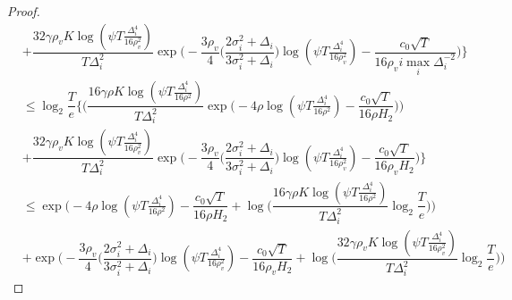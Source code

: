 \begin{proof}
\begin{align*}
& +  \dfrac{32\gamma\rho_v K\log (\psi T \frac{\Delta_{i}^{4}}{16\rho_{v}^{2}})}{T\Delta_{i}^{2}}\exp\bigg(- \dfrac{3\rho_v}{4} \bigg(\dfrac{2\sigma_{i}^{2}+\Delta_{i}}{3\sigma_{i}^{2}+\Delta_{i}}\bigg)\log(\psi T\frac{\Delta_{i}^{4}}{16\rho_{v}^{2}}) -\dfrac{c_{0}\sqrt{T}}{16\rho_vi\max_{i}\Delta_{i}^{-2}}  \bigg) \bigg\rbrace\\
& \leq \log_{2}\dfrac{T}{e}\bigg\lbrace \bigg(\dfrac{16\gamma\rho K\log (\psi T \frac{\Delta_{i}^{4}}{16\rho^{2}})}{T\Delta_{i}^{2}}\exp\big(-4\rho\log (\psi T\frac{\Delta_{i}^{4}}{16\rho^{2}})-\dfrac{c_{0}\sqrt{T}}{16\rho H_{2}}\big)\bigg) \\
& + \dfrac{32\gamma\rho_v K\log (\psi T \frac{\Delta_{i}^{4}}{16\rho_{v}^{2}})}{T\Delta_{i}^{2}}\exp\bigg(- \dfrac{3\rho_v}{4} \bigg(\dfrac{2\sigma_{i}^{2}+\Delta_{i}}{3\sigma_{i}^{2}+\Delta_{i}}\bigg)\log(\psi T\frac{\Delta_{i}^{4}}{16\rho_{v}^{2}}) -\dfrac{c_{0}\sqrt{T}}{16\rho_v H_{2}}  \bigg)\bigg\rbrace\\
& \leq \exp\bigg(-4\rho\log (\psi T\frac{\Delta_{i}^{4}}{16\rho^{2}})-\dfrac{c_{0}\sqrt{T}}{16\rho H_{2}} + \log \big( \dfrac{16\gamma\rho K\log (\psi T \frac{\Delta_{i}^{4}}{16\rho^{2}})}{T\Delta_{i}^{2}}\log_{2}\dfrac{T}{e} \big)\bigg)\\
& + \exp\bigg(- \dfrac{3\rho_v}{4} \bigg(\dfrac{2\sigma_{i}^{2}+\Delta_{i}}{3\sigma_{i}^{2}+\Delta_{i}}\bigg)\log(\psi T\frac{\Delta_{i}^{4}}{16\rho_{v}^{2}}) -\dfrac{c_{0}\sqrt{T}}{16\rho_v H_{2}} + \log\big ( \dfrac{32\gamma\rho_v K\log (\psi T \frac{\Delta_{i}^{4}}{16\rho_{v}^{2}})}{T\Delta_{i}^{2}}\log_{2}\dfrac{T}{e} \big)  \bigg)
\end{align*}




\end{proof}
